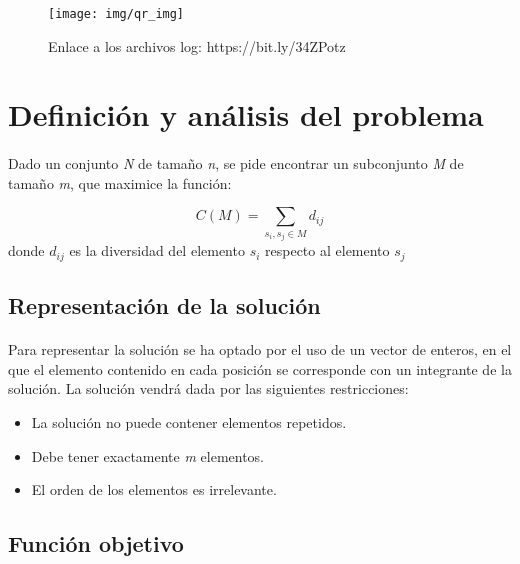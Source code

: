 \documentclass{article}
\begin{document}
	\begin{figure}[H]
		
		\centering
		\texttt{[image: img/qr\_img]}
		\caption{Enlace a los archivos log: https://bit.ly/34ZPotz }
		
	\end{figure}

	\newpage
	
	\tableofcontents
	
	\newpage
	
	\section{Definición y análisis del problema}
	
	\paragraph{}Dado un conjunto \emph{N} de tamaño \emph{n}, se pide encontrar un subconjunto \emph{M} de tamaño \emph{m}, que maximice
	la función: 
	
	\[ C(M)=\sum_{s_i , s_j \in M} d_{ij}\]
	donde  $d_{ij}$ es la diversidad del elemento $s_i$ respecto al elemento $s_j$
	
	\subsection{Representación de la solución}
	
	\paragraph{} Para representar la solución se ha optado por el uso de un vector de enteros, en el que el elemento contenido en cada posición se corresponde con un integrante de la solución. La solución vendrá dada por las siguientes restricciones:
	\begin{itemize}
		
		\item La solución no puede contener elementos repetidos.
		
		\item Debe tener exactamente \emph{m} elementos.
		
		\item El orden de los elementos es irrelevante.
		
	\end{itemize}
	
	
	\subsection{Función objetivo}
	
\end{document}
